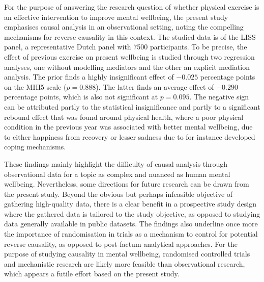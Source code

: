 For the purpose of answering the research question of whether physical exercise is an effective intervention
to improve mental wellbeing, the present study emphasises causal analysis in an observational setting, noting
the compelling mechanisms for reverse causality in this context.
The studied data is of the LISS panel, a representative Dutch panel with 7500 participants.
To be precise, the effect of previous exercise on present wellbeing is studied through two regression analyses,
one without modelling mediators and the other an explicit mediation analysis.
The prior finds a highly insignificant effect of $-0.025$ percentage points on the MHI5 scale ($p = 0.888$).
The latter finds an average effect of $-0.290$ percentage points, which is also not significant at $p = 0.095$.
The negative sign can be attributed partly to the statistical insignificance and partly to a significant rebound effect
that was found around physical health, where a poor physical condition
in the previous year was associated with better mental wellbeing, due to either happiness from recovery or lesser
sadness due to for instance developed coping mechanisms.

These findings mainly highlight the difficulty of causal analysis through observational data for a topic as complex
and nuanced as human mental wellbeing. Nevertheless, some directions for future research can be drawn from the present study.
Beyond the obvious but perhaps infeasible objective of gathering high-quality data,
there is a clear benefit in a prospective study design where the gathered data is tailored to the study objective,
as opposed to studying data generally available in public datasets.
The findings also underline once more the importance of randomisation in trials as a mechanism to control for potential
reverse causality, as opposed to post-factum analytical approaches.
For the purpose of studying causality in mental wellbeing, randomised controlled trials and mechanistic research are
likely more feasible than observational research, which appears a futile effort based on the present study.
